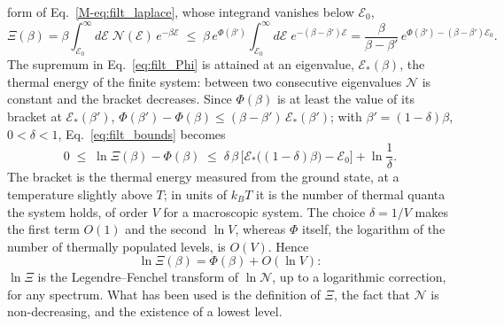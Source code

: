 \documentclass[10pt,a4paper]{article}
\theoremstyle{plain}
\theoremstyle{remark}
\newcommand{\cN}{\mathcal{N}}   %
\newcommand{\enrg}{\mathcal{E}}  %
\begin{document}
form of Eq.~\eqref{M-eq:filt_laplace}, whose integrand vanishes below $\enrg_0$,
\[
  \Xi(\beta)=\beta\int_{\enrg_0}^{\infty}d\enrg\;\cN(\enrg)\,e^{-\beta\enrg}
  \;\le\;\beta\,e^{\Phi(\beta')}\int_{\enrg_0}^{\infty}d\enrg\;e^{-(\beta-\beta')\enrg}
  =\frac{\beta}{\beta-\beta'}\,e^{\Phi(\beta')-(\beta-\beta')\enrg_0} .
\]
The supremum in Eq.~\eqref{eq:filt_Phi} is attained at an eigenvalue,
$\enrg_*(\beta)$, the thermal energy of the finite system: between two
consecutive eigenvalues $\cN$ is constant and the bracket decreases. Since
$\Phi(\beta)$ is at least the value of its bracket at $\enrg_*(\beta')$,
$\Phi(\beta')-\Phi(\beta)\le(\beta-\beta')\,\enrg_*(\beta')$; with
$\beta'=(1-\delta)\beta$, $0<\delta<1$, Eq.~\eqref{eq:filt_bounds} becomes
\begin{equation}\label{eq:filt_bounds2}
  0\;\le\;\ln\Xi(\beta)-\Phi(\beta)\;\le\;\delta\,\beta\,\big[\enrg_*\big((1-\delta)\beta\big)-\enrg_0\big]+\ln\frac1\delta .
\end{equation}
The bracket is the thermal energy measured from the ground state, at a
temperature slightly above $T$; in units of $k_BT$ it is the number of
thermal quanta the system holds, of order $V$ for a macroscopic system. The
choice $\delta=1/V$ makes the first term $O(1)$ and the second $\ln V$,
whereas $\Phi$ itself, the logarithm of the number of thermally populated
levels, is $O(V)$. Hence
\begin{equation}\label{eq:filt_lnXi}
  \ln\Xi(\beta)=\Phi(\beta)+O(\ln V) :
\end{equation}
$\ln\Xi$ is the Legendre--Fenchel transform of $\ln\cN$, up to a logarithmic
correction, for any spectrum. What has been used is the definition of $\Xi$,
the fact that $\cN$ is non-decreasing, and the existence of a lowest level.
\end{document}
